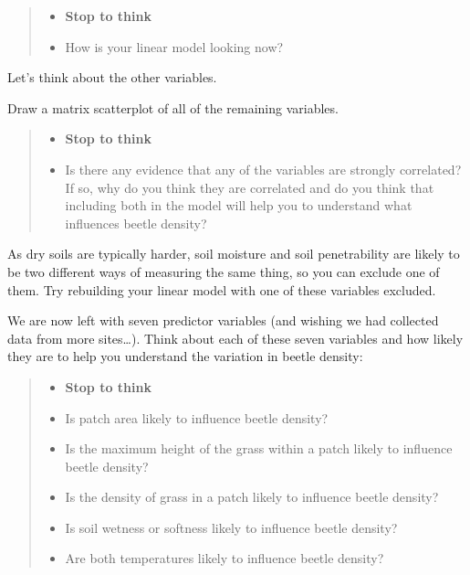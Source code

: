 \documentclass[
]{book}
\providecommand{\tightlist}{%
  \setlength{\itemsep}{0pt}\setlength{\parskip}{0pt}}
\begin{document}
\begin{quote}
\begin{itemize}
\tightlist
\item
  \textbf{Stop to think}
\item
  How is your linear model looking now?
\end{itemize}
\end{quote}

Let's think about the other variables.

Draw a matrix scatterplot of all of the remaining variables.

\begin{quote}
\begin{itemize}
\tightlist
\item
  \textbf{Stop to think}
\item
  Is there any evidence that any of the variables are strongly correlated? If so, why do you think they are correlated and do you think that including both in the model will help you to understand what influences beetle density?
\end{itemize}
\end{quote}

As dry soils are typically harder, soil moisture and soil penetrability are likely to be two different ways of measuring the same thing, so you can exclude one of them. Try rebuilding your linear model with one of these variables excluded.

We are now left with seven predictor variables (and wishing we had collected data from more sites\ldots). Think about each of these seven variables and how likely they are to help you understand the variation in beetle density:

\begin{quote}
\begin{itemize}
\tightlist
\item
  \textbf{Stop to think}
\item
  Is patch area likely to influence beetle density?
\item
  Is the maximum height of the grass within a patch likely to influence beetle density?
\item
  Is the density of grass in a patch likely to influence beetle density?
\item
  Is soil wetness or softness likely to influence beetle density?
\item
  Are both temperatures likely to influence beetle density?
\end{itemize}
\end{quote}
\end{document}
